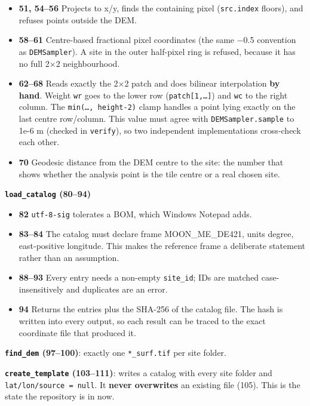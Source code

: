\documentclass[11pt,a4paper]{article}
\providecommand{\tightlist}{\setlength{\itemsep}{0pt}\setlength{\parskip}{0pt}}
\begin{document}
\begin{itemize}
\tightlist
\item
  \textbf{51, 54--56} Projects to x/y, finds the containing pixel
  (\texttt{src.index} floors), and refuses points
  outside the DEM.
\item
  \textbf{58--61} Centre-based fractional pixel coordinates (the same
  −0.5 convention as \texttt{DEMSampler}). A site in
  the outer half-pixel ring is refused, because it has no full 2×2
  neighbourhood.
\item
  \textbf{62--68} Reads exactly the 2×2 patch and does bilinear
  interpolation \textbf{by hand}. Weight \texttt{wr}
  goes to the lower row (\texttt{patch[1,…]}) and
  \texttt{wc} to the right column. The
  \texttt{min(…, height-2)} clamp handles a point lying
  exactly on the last centre row/column. This value must agree with
  \texttt{DEMSampler.sample} to 1e-6 m (checked in
  \texttt{verify}), so two independent implementations
  cross-check each other.
\item
  \textbf{70} Geodesic distance from the DEM centre to the site: the
  number that shows whether the analysis point is the tile centre or a
  real chosen site.
\end{itemize}

\textbf{\texttt{load\_catalog} (80--94)}

\begin{itemize}
\tightlist
\item
  \textbf{82} \texttt{utf-8-sig} tolerates a BOM, which
  Windows Notepad adds.
\item
  \textbf{83--84} The catalog must declare frame MOON\_ME\_DE421, units
  degree, east-positive longitude. This makes the reference frame a
  deliberate statement rather than an assumption.
\item
  \textbf{88--93} Every entry needs a non-empty
  \texttt{site\_id}; IDs are matched case-insensitively
  and duplicates are an error.
\item
  \textbf{94} Returns the entries plus the SHA-256 of the catalog file.
  The hash is written into every output, so each result can be traced to
  the exact coordinate file that produced it.
\end{itemize}

\textbf{\texttt{find\_dem} (97--100)}: exactly one
\texttt{*\_surf.tif} per site folder.

\textbf{\texttt{create\_template} (103--111)}: writes a
catalog with every site folder and
\texttt{lat/lon/source = null}. It \textbf{never
overwrites} an existing file (105). This is the state the repository is
in now.
\end{document}
